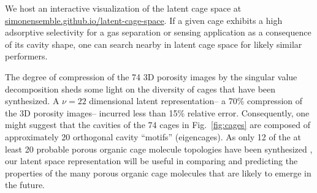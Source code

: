 \documentclass[journal=jacsat,manuscript=article,layout=traditional]{achemso}
\begin{document}
We host an interactive visualization of the latent cage space at \url{simonensemble.github.io/latent-cage-space}. If a given cage exhibits a high adsorptive selectivity for a gas separation or sensing application as a consequence of its cavity shape, one can search nearby in latent cage space for likely similar performers.

The degree of compression of the 74 3D porosity images by the singular value decomposition sheds some light on the diversity of cages that have been synthesized. A $\nu=22$ dimensional latent representation-- a 70\% compression of the 3D porosity images-- incurred less than 15\% relative error. Consequently, one might suggest that the cavities of the 74 cages in Fig.~\ref{fig:cages} are composed of approximately 20 orthogonal cavity ``motifs'' (eigencages). As only 12 of the at least 20 probable porous organic cage molecule topologies have been synthesized \cite{santolini2017topological}, our latent space representation will be useful in comparing and predicting the properties of the many porous organic cage molecules that are likely to emerge in the future.
\end{document}
